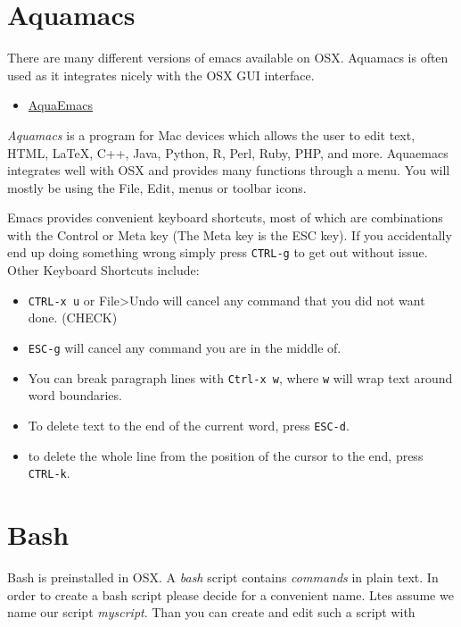 \section{Aquamacs}\label{aquamacs}

There are many different versions of emacs available on OSX. Aquamacs is
often used as it integrates nicely with the OSX GUI interface.

\begin{itemize}
\tightlist
\item
  \href{http://aquamacs.org/download.shtml}{AquaEmacs}
\end{itemize}

\emph{Aquamacs} is a program for Mac devices which allows the user to
edit text, HTML, LaTeX, C++, Java, Python, R, Perl, Ruby, PHP, and more.
Aquaemacs integrates well with OSX and provides many functions through a
menu. You will mostly be using the File, Edit, menus or toolbar icons.

Emacs provides convenient keyboard shortcuts, most of which are
combinations with the Control or Meta key (The Meta key is the ESC key).
If you accidentally end up doing something wrong simply press
\texttt{CTRL-g} to get out without issue. Other Keyboard Shortcuts
include:

\begin{itemize}
\item
  \texttt{CTRL-x\ u} or File\textgreater{}Undo will cancel any command
  that you did not want done. (CHECK)
\item
  \texttt{ESC-g} will cancel any command you are in the middle of.
\item
  You can break paragraph lines with \texttt{Ctrl-x\ w}, where
  \texttt{w} will wrap text around word boundaries.
\item
  To delete text to the end of the current word, press \texttt{ESC-d}.
\item
  to delete the whole line from the position of the cursor to the end,
  press \texttt{CTRL-k}.
\end{itemize}

\section{Bash}\label{bash}

Bash is preinstalled in OSX. A \emph{bash} script contains
\emph{commands} in plain text. In order to create a bash script please
decide for a convenient name. Ltes assume we name our script
\emph{myscript}. Than you can create and edit such a script with

